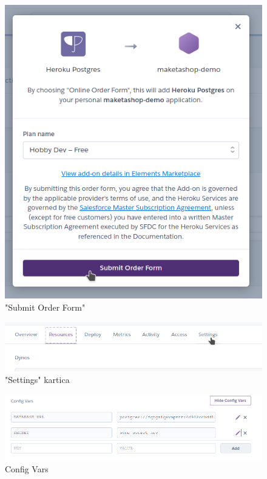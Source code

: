 			\begin{figure}[H]
				\includegraphics[width=.9\linewidth]{slike/20210114_214812.png}
				\centering
				\caption{"Submit Order Form"}
				\label{fig:orderform}
			\end{figure}
			\begin{figure}[H]
				\includegraphics[width=.9\linewidth]{slike/20210114_215739.png}
				\centering
				\caption{"Settings" kartica}
				\label{fig:settingstab}
			\end{figure}
			\begin{figure}[H]
				\includegraphics[width=.9\linewidth]{slike/20210114_220108.png}
				\centering
				\caption{Config Vars}
				\label{fig:configvars}
			\end{figure}
